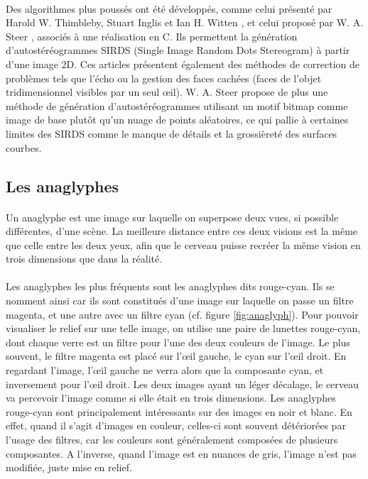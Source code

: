 \paragraph{}
Des algorithmes plus poussés ont été développés, comme celui présenté par Harold W. Thimbleby, Stuart Inglis et Ian H. Witten \cite{stereogram}, et celui proposé par W. A. Steer \cite{wasteer}, associés à une réalisation en C. Ils permettent la génération d’autostéréogrammes SIRDS (Single Image Random Dots Stereogram) à partir d’une image 2D. Ces articles présentent également des méthodes de correction de problèmes tels que l'écho ou la gestion des faces cachées (faces de l'objet tridimensionnel visibles par un seul œil). W. A. Steer propose de plus une méthode de génération d'autostéréogrammes utilisant un motif bitmap comme image de base plutôt qu'un nuage de points aléatoires, ce qui pallie à certaines limites des SIRDS comme le manque de détails et la grossièreté des surfaces courbes.


\subsection{Les anaglyphes}

\paragraph{}
	Un anaglyphe est une image sur laquelle on superpose deux vues, si possible différentes, d’une scène. La meilleure distance entre ces deux visions est la même que celle entre les deux yeux, afin que le cerveau puisse recréer la même vision en trois dimensions que dans la réalité.
	
\paragraph{}
	Les anaglyphes les plus fréquents sont les anaglyphes dits rouge-cyan. Ils se nomment ainsi car ils sont constitués d’une image sur laquelle on passe un filtre magenta, et une autre avec un filtre cyan (cf. figure \ref{fig:anaglyph}). Pour pouvoir visualiser le relief sur une telle image, on utilise une paire de lunettes rouge-cyan, dont chaque verre est un filtre pour l’une des deux couleurs de l’image. Le plus souvent, le filtre magenta est placé sur l’œil gauche, le cyan sur l’œil droit. En regardant l’image, l’œil gauche ne verra alors que la composante cyan, et inversement pour l’œil droit. Les deux images ayant un léger décalage, le cerveau va percevoir l’image comme si elle était en trois dimensions. Les anaglyphes rouge-cyan sont principalement intéressants sur des images en noir et blanc. En effet, quand il s’agit d’images en couleur, celles-ci sont souvent détériorées par l’usage des filtres, car les couleurs sont généralement composées de plusieurs composantes. A l’inverse, quand l’image est en nuances de gris, l’image n’est pas modifiée, juste mise en relief.

